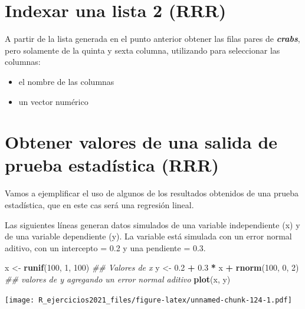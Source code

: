 \documentclass[]{book}
\newenvironment{Shaded}{\begin{snugshade}}{\end{snugshade}}
\newcommand{\CommentTok}[1]{\textcolor[rgb]{0.56,0.35,0.01}{\textit{#1}}}
\newcommand{\DecValTok}[1]{\textcolor[rgb]{0.00,0.00,0.81}{#1}}
\newcommand{\FloatTok}[1]{\textcolor[rgb]{0.00,0.00,0.81}{#1}}
\newcommand{\KeywordTok}[1]{\textcolor[rgb]{0.13,0.29,0.53}{\textbf{#1}}}
\newcommand{\NormalTok}[1]{#1}
\newcommand{\OperatorTok}[1]{\textcolor[rgb]{0.81,0.36,0.00}{\textbf{#1}}}
\newcommand{\StringTok}[1]{\textcolor[rgb]{0.31,0.60,0.02}{#1}}
\providecommand{\tightlist}{%
  \setlength{\itemsep}{0pt}\setlength{\parskip}{0pt}}
\begin{document}
\hypertarget{indexar-una-lista-2-rrr}{%
\section{Indexar una lista 2 (RRR)}\label{indexar-una-lista-2-rrr}}

A partir de la lista generada en el punto anterior obtener las filas pares de \textbf{\emph{crabs}}, pero solamente de la quinta y sexta columna, utilizando para seleccionar las columnas:

\begin{itemize}
\tightlist
\item
  el nombre de las columnas
\item
  un vector numérico
\end{itemize}

\hypertarget{obtener-valores-de-una-salida-de-prueba-estaduxedstica-rrr}{%
\section{Obtener valores de una salida de prueba estadística (RRR)}\label{obtener-valores-de-una-salida-de-prueba-estaduxedstica-rrr}}

Vamos a ejemplificar el uso de algunos de los resultados obtenidos de una prueba estadística, que en este cas será una regresión lineal.

Las siguientes líneas generan datos simulados de una variable independiente (x) y de una variable dependiente (y). La variable está simulada con un error normal aditivo, con un intercepto = 0.2 y una pendiente = 0.3.

\begin{Shaded}
\begin{Highlighting}[]
\NormalTok{x <-}\StringTok{ }\KeywordTok{runif}\NormalTok{(}\DecValTok{100}\NormalTok{, }\DecValTok{1}\NormalTok{, }\DecValTok{100}\NormalTok{) }\CommentTok{## Valores de x}
\NormalTok{y <-}\StringTok{ }\FloatTok{0.2} \OperatorTok{+}\StringTok{ }\FloatTok{0.3} \OperatorTok{*}\StringTok{ }\NormalTok{x }\OperatorTok{+}\StringTok{ }\KeywordTok{rnorm}\NormalTok{(}\DecValTok{100}\NormalTok{, }\DecValTok{0}\NormalTok{, }\DecValTok{2}\NormalTok{) }\CommentTok{## valores de y agregando un error normal aditivo}
\KeywordTok{plot}\NormalTok{(x, y)}
\end{Highlighting}
\end{Shaded}

\texttt{[image: R\_ejercicios2021\_files/figure-latex/unnamed-chunk-124-1.pdf]}
\end{document}
